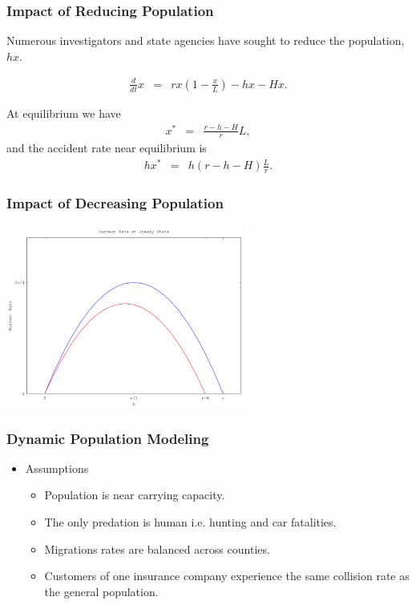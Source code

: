 \documentclass{beamer}   %
\newcommand{\lp}{\left(}
\newcommand{\rp}{\right)}
\begin{document}
\begin{frame}
  \frametitle{Impact of Reducing Population}

  Numerous investigators and state agencies have sought to reduce the
  population, $hx$. 

  \vfill

  \begin{eqnarray*}
    \frac{d}{dt} x & = & r x \lp 1 - \frac{x}{L} \rp - h x - Hx.
  \end{eqnarray*}

  \vfill

  At equilibrium we have
  \begin{eqnarray*}
    x^* & = & \frac{r-h-H}{r} L,
  \end{eqnarray*}
  and the accident rate near equilibrium is
  \begin{eqnarray*}
    h x^* & = & h(r-h-H)\frac{L}{r}.
  \end{eqnarray*}


\end{frame}


\begin{frame}
  \frametitle{Impact of Decreasing Population}
  \centerline{\includegraphics[height=6cm]{reducedPopulation}}
\end{frame}


\begin{frame}
  \frametitle{Dynamic Population Modeling}
  \begin{itemize}
  \item Assumptions
    \begin{itemize}
    \item Population is near carrying capacity.
    \item The only predation is human i.e. hunting and car fatalities.
    \item Migrations rates are balanced across counties.
    \item Customers of one insurance company experience
      the same collision rate as the general population.
    \end{itemize}
  \end{itemize}
\end{frame}
\end{document}
